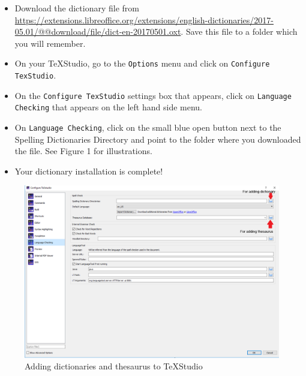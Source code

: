 \documentclass[]{article}
\begin{document}
\begin{itemize}
	\item Download the dictionary file from \url{https://extensions.libreoffice.org/extensions/english-dictionaries/2017-05.01/@@download/file/dict-en-20170501.oxt}. Save this file to a folder which you will remember.
	\item On your TeXStudio, go to the \texttt{Options} menu and click on \texttt{Configure TexStudio}.
	\item On the \texttt{Configure TexStudio} settings box that appears, click on \texttt{Language Checking} that appears on the left hand side menu.
	\item On \texttt{Language Checking}, click on the small blue open button next to the Spelling Dictionaries Directory and point to the folder where you downloaded the file. See Figure 1 for illustrations.
	\item Your dictionary installation is complete!
\end{itemize}

\begin{figure}[H]
	\centering
	\includegraphics[scale = 0.5]{img/languagetool}
	\caption{Adding dictionaries and thesaurus to TeXStudio}
\end{figure}
\end{document}
